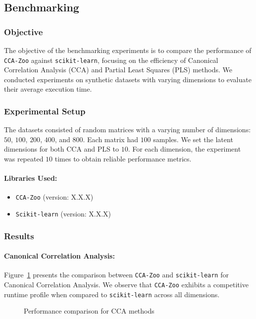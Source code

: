 \subsection{Benchmarking}
\subsubsection{Objective}
The objective of the benchmarking experiments is to compare the performance of \texttt{CCA-Zoo} against \texttt{scikit-learn}, focusing on the efficiency of Canonical Correlation Analysis (CCA) and Partial Least Squares (PLS) methods.
We conducted experiments on synthetic datasets with varying dimensions to evaluate their average execution time.

\subsubsection{Experimental Setup}
The datasets consisted of random matrices with a varying number of dimensions: \(50\), \(100\), \(200\), \(400\), and \(800\). Each matrix had \(100\) samples. We set the latent dimensions for both CCA and PLS to \(10\). For each dimension, the experiment was repeated \(10\) times to obtain reliable performance metrics.

\paragraph{Libraries Used:}
\begin{itemize}
    \item \texttt{CCA-Zoo} (version: X.X.X)
    \item \texttt{Scikit-learn} (version: X.X.X)
\end{itemize}

\subsubsection{Results}

\paragraph{Canonical Correlation Analysis:}
Figure~\ref{fig:cca_benchmark} presents the comparison between \texttt{CCA-Zoo} and \texttt{scikit-learn} for Canonical Correlation Analysis. We observe that \texttt{CCA-Zoo} exhibits a competitive runtime profile when compared to \texttt{scikit-learn} across all dimensions.

\begin{figure}[h]
\centering

\caption{Performance comparison for CCA methods}
\label{fig:cca_benchmark}
\end{figure}

